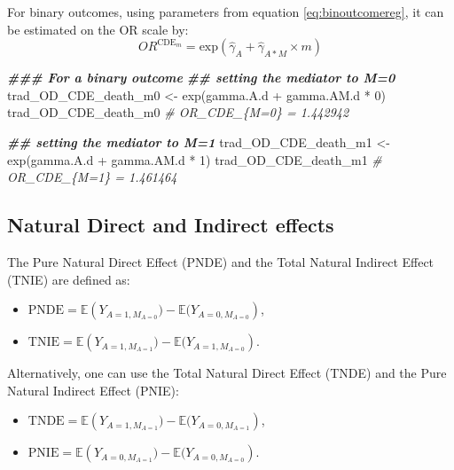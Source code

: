 \documentclass[
]{book}
\newenvironment{Shaded}{\begin{snugshade}}{\end{snugshade}}
\newcommand{\CommentTok}[1]{\textcolor[rgb]{0.56,0.35,0.01}{\textit{#1}}}
\newcommand{\DecValTok}[1]{\textcolor[rgb]{0.00,0.00,0.81}{#1}}
\newcommand{\DocumentationTok}[1]{\textcolor[rgb]{0.56,0.35,0.01}{\textbf{\textit{#1}}}}
\newcommand{\FunctionTok}[1]{\textcolor[rgb]{0.00,0.00,0.00}{#1}}
\newcommand{\NormalTok}[1]{#1}
\newcommand{\OtherTok}[1]{\textcolor[rgb]{0.56,0.35,0.01}{#1}}
\newcommand{\SpecialCharTok}[1]{\textcolor[rgb]{0.00,0.00,0.00}{#1}}
\providecommand{\tightlist}{%
  \setlength{\itemsep}{0pt}\setlength{\parskip}{0pt}}
\begin{document}
For binary outcomes, using parameters from equation \eqref{eq:binoutcomereg}, it can be estimated on the OR scale by:
\[OR^{\text{CDE}_m} = \text{exp}\left(\hat{\gamma}_A + \hat{\gamma}_{A \ast M} \times m\right)\]

\begin{Shaded}
\begin{Highlighting}[]
\DocumentationTok{\#\#\# For a binary outcome}
\DocumentationTok{\#\# setting the mediator to M=0}
\NormalTok{trad\_OD\_CDE\_death\_m0 }\OtherTok{\textless{}{-}} \FunctionTok{exp}\NormalTok{(gamma.A.d }\SpecialCharTok{+}\NormalTok{ gamma.AM.d }\SpecialCharTok{*} \DecValTok{0}\NormalTok{)}
\NormalTok{trad\_OD\_CDE\_death\_m0}
\CommentTok{\# OR\_CDE\_\{M=0\} = 1.442942 }

\DocumentationTok{\#\# setting the mediator to M=1}
\NormalTok{trad\_OD\_CDE\_death\_m1 }\OtherTok{\textless{}{-}} \FunctionTok{exp}\NormalTok{(gamma.A.d }\SpecialCharTok{+}\NormalTok{ gamma.AM.d }\SpecialCharTok{*} \DecValTok{1}\NormalTok{)}
\NormalTok{trad\_OD\_CDE\_death\_m1}
\CommentTok{\# OR\_CDE\_\{M=1\} = 1.461464 }
\end{Highlighting}
\end{Shaded}

\hypertarget{trad2waynatural}{%
\subsection{Natural Direct and Indirect effects}\label{trad2waynatural}}

The Pure Natural Direct Effect (PNDE) and the Total Natural Indirect Effect (TNIE) are defined as:

\begin{itemize}
\tightlist
\item
  \(\text{PNDE} = \mathbb{E}\left(Y_{A=1,M_{A=0}}) - \mathbb{E}(Y_{A=0,M_{A=0}}\right)\),
\item
  \(\text{TNIE} = \mathbb{E}\left(Y_{A=1,M_{A=1}}) - \mathbb{E}(Y_{A=1,M_{A=0}}\right)\).
\end{itemize}

Alternatively, one can use the Total Natural Direct Effect (TNDE) and the Pure Natural Indirect Effect (PNIE):

\begin{itemize}
\tightlist
\item
  \(\text{TNDE} = \mathbb{E}\left(Y_{A=1,M_{A=1}}) - \mathbb{E}(Y_{A=0,M_{A=1}}\right)\),
\item
  \(\text{PNIE} = \mathbb{E}\left(Y_{A=0,M_{A=1}}) - \mathbb{E}(Y_{A=0,M_{A=0}}\right)\).
\end{itemize}
\end{document}
